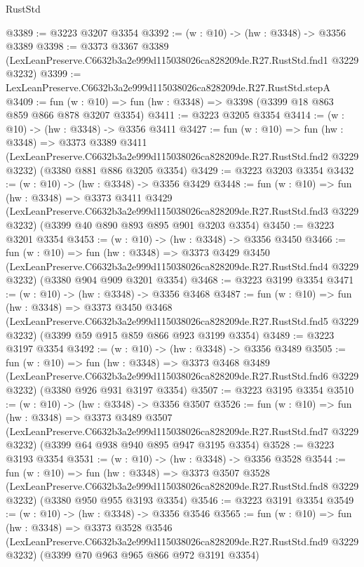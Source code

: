 \begin{lexlean}{RustStd}
\begin{coremodule}
@3389 := @3223 @3207 @3354
@3392 := (w : @10) -> (hw : @3348) -> @3356 @3389
@3398 := @3373
    @3367
    @3389
    (LexLeanPreserve.C6632b3a2e999d115038026ca828209de.R27.RustStd.fnd1 @3229 @3232)
@3399 := LexLeanPreserve.C6632b3a2e999d115038026ca828209de.R27.RustStd.stepA
@3409 := fun (w : @10) => fun (hw : @3348) => @3398 (@3399 @18 @863 @859 @866 @878 @3207 @3354)
@3411 := @3223 @3205 @3354
@3414 := (w : @10) -> (hw : @3348) -> @3356 @3411
@3427 := fun (w : @10) =>
  fun (hw : @3348) =>
  @3373
    @3389
    @3411
    (LexLeanPreserve.C6632b3a2e999d115038026ca828209de.R27.RustStd.fnd2 @3229 @3232)
    (@3380 @881 @886 @3205 @3354)
@3429 := @3223 @3203 @3354
@3432 := (w : @10) -> (hw : @3348) -> @3356 @3429
@3448 := fun (w : @10) =>
  fun (hw : @3348) =>
  @3373
    @3411
    @3429
    (LexLeanPreserve.C6632b3a2e999d115038026ca828209de.R27.RustStd.fnd3 @3229 @3232)
    (@3399 @40 @890 @893 @895 @901 @3203 @3354)
@3450 := @3223 @3201 @3354
@3453 := (w : @10) -> (hw : @3348) -> @3356 @3450
@3466 := fun (w : @10) =>
  fun (hw : @3348) =>
  @3373
    @3429
    @3450
    (LexLeanPreserve.C6632b3a2e999d115038026ca828209de.R27.RustStd.fnd4 @3229 @3232)
    (@3380 @904 @909 @3201 @3354)
@3468 := @3223 @3199 @3354
@3471 := (w : @10) -> (hw : @3348) -> @3356 @3468
@3487 := fun (w : @10) =>
  fun (hw : @3348) =>
  @3373
    @3450
    @3468
    (LexLeanPreserve.C6632b3a2e999d115038026ca828209de.R27.RustStd.fnd5 @3229 @3232)
    (@3399 @59 @915 @859 @866 @923 @3199 @3354)
@3489 := @3223 @3197 @3354
@3492 := (w : @10) -> (hw : @3348) -> @3356 @3489
@3505 := fun (w : @10) =>
  fun (hw : @3348) =>
  @3373
    @3468
    @3489
    (LexLeanPreserve.C6632b3a2e999d115038026ca828209de.R27.RustStd.fnd6 @3229 @3232)
    (@3380 @926 @931 @3197 @3354)
@3507 := @3223 @3195 @3354
@3510 := (w : @10) -> (hw : @3348) -> @3356 @3507
@3526 := fun (w : @10) =>
  fun (hw : @3348) =>
  @3373
    @3489
    @3507
    (LexLeanPreserve.C6632b3a2e999d115038026ca828209de.R27.RustStd.fnd7 @3229 @3232)
    (@3399 @64 @938 @940 @895 @947 @3195 @3354)
@3528 := @3223 @3193 @3354
@3531 := (w : @10) -> (hw : @3348) -> @3356 @3528
@3544 := fun (w : @10) =>
  fun (hw : @3348) =>
  @3373
    @3507
    @3528
    (LexLeanPreserve.C6632b3a2e999d115038026ca828209de.R27.RustStd.fnd8 @3229 @3232)
    (@3380 @950 @955 @3193 @3354)
@3546 := @3223 @3191 @3354
@3549 := (w : @10) -> (hw : @3348) -> @3356 @3546
@3565 := fun (w : @10) =>
  fun (hw : @3348) =>
  @3373
    @3528
    @3546
    (LexLeanPreserve.C6632b3a2e999d115038026ca828209de.R27.RustStd.fnd9 @3229 @3232)
    (@3399 @70 @963 @965 @866 @972 @3191 @3354)

\end{coremodule}
\end{lexlean}
